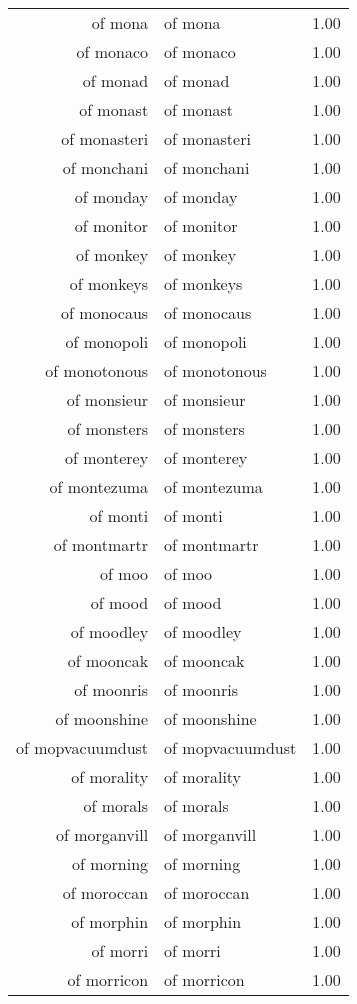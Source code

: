 \begin{table}[ht]
\begin{tabular}{rlr}
  of mona & of mona & 1.00 \\ 
  of monaco & of monaco & 1.00 \\ 
  of monad & of monad & 1.00 \\ 
  of monast & of monast & 1.00 \\ 
  of monasteri & of monasteri & 1.00 \\ 
  of monchani & of monchani & 1.00 \\ 
  of monday & of monday & 1.00 \\ 
  of monitor & of monitor & 1.00 \\ 
  of monkey & of monkey & 1.00 \\ 
  of monkeys & of monkeys & 1.00 \\ 
  of monocaus & of monocaus & 1.00 \\ 
  of monopoli & of monopoli & 1.00 \\ 
  of monotonous & of monotonous & 1.00 \\ 
  of monsieur & of monsieur & 1.00 \\ 
  of monsters & of monsters & 1.00 \\ 
  of monterey & of monterey & 1.00 \\ 
  of montezuma & of montezuma & 1.00 \\ 
  of monti & of monti & 1.00 \\ 
  of montmartr & of montmartr & 1.00 \\ 
  of moo & of moo & 1.00 \\ 
  of mood & of mood & 1.00 \\ 
  of moodley & of moodley & 1.00 \\ 
  of mooncak & of mooncak & 1.00 \\ 
  of moonris & of moonris & 1.00 \\ 
  of moonshine & of moonshine & 1.00 \\ 
  of mopvacuumdust & of mopvacuumdust & 1.00 \\ 
  of morality & of morality & 1.00 \\ 
  of morals & of morals & 1.00 \\ 
  of morganvill & of morganvill & 1.00 \\ 
  of morning & of morning & 1.00 \\ 
  of moroccan & of moroccan & 1.00 \\ 
  of morphin & of morphin & 1.00 \\ 
  of morri & of morri & 1.00 \\ 
  of morricon & of morricon & 1.00 \\ 

\end{tabular}
\end{table}

